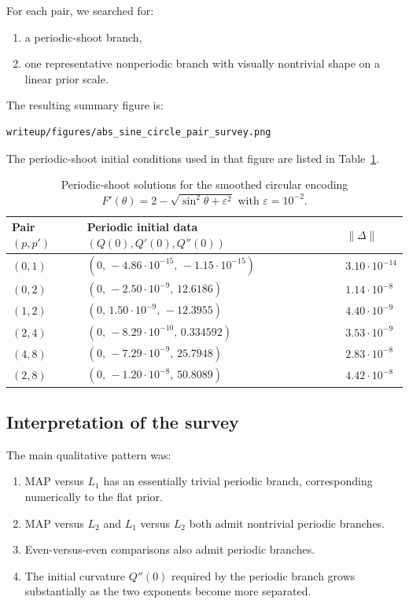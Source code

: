 \documentclass[11pt]{article}
\begin{document}
For each pair, we searched for:
\begin{enumerate}
\item a periodic-shoot branch,
\item one representative nonperiodic branch with visually nontrivial shape on a linear prior scale.
\end{enumerate}

The resulting summary figure is:
\begin{Verbatim}[fontsize=\small]
writeup/figures/abs_sine_circle_pair_survey.png
\end{Verbatim}

The periodic-shoot initial conditions used in that figure are listed in Table~\ref{tab:periodic}.

\begin{table}[h]
\centering
\begin{tabular}{>{\raggedright\arraybackslash}p{} >{\raggedright\arraybackslash}p{} >{\raggedright\arraybackslash}p{}}
\toprule
Pair $(p,p')$ & Periodic initial data $(Q(0),Q'(0),Q''(0))$ & $\|\Delta\|$ \\
\midrule
$(0,1)$ & $(0,\,-4.86\cdot 10^{-15},\,-1.15\cdot 10^{-15})$ & $3.10\cdot 10^{-14}$ \\
$(0,2)$ & $(0,\,-2.50\cdot 10^{-9},\,12.6186)$ & $1.14\cdot 10^{-8}$ \\
$(1,2)$ & $(0,\,1.50\cdot 10^{-9},\,-12.3955)$ & $4.40\cdot 10^{-9}$ \\
$(2,4)$ & $(0,\,-8.29\cdot 10^{-10},\,0.334592)$ & $3.53\cdot 10^{-9}$ \\
$(4,8)$ & $(0,\,-7.29\cdot 10^{-9},\,25.7948)$ & $2.83\cdot 10^{-8}$ \\
$(2,8)$ & $(0,\,-1.20\cdot 10^{-8},\,50.8089)$ & $4.42\cdot 10^{-8}$ \\
\bottomrule
\end{tabular}
\caption{Periodic-shoot solutions for the smoothed circular encoding $F'(\theta)=2-\sqrt{\sin^2\theta+\varepsilon^2}$ with $\varepsilon=10^{-2}$.}
\label{tab:periodic}
\end{table}

\subsection{Interpretation of the survey}

The main qualitative pattern was:
\begin{enumerate}
\item MAP versus $L_1$ has an essentially trivial periodic branch, corresponding numerically to the flat prior.
\item MAP versus $L_2$ and $L_1$ versus $L_2$ both admit nontrivial periodic branches.
\item Even-versus-even comparisons also admit periodic branches.
\item The initial curvature $Q''(0)$ required by the periodic branch grows substantially as the two exponents become more separated.
\end{enumerate}
\end{document}
